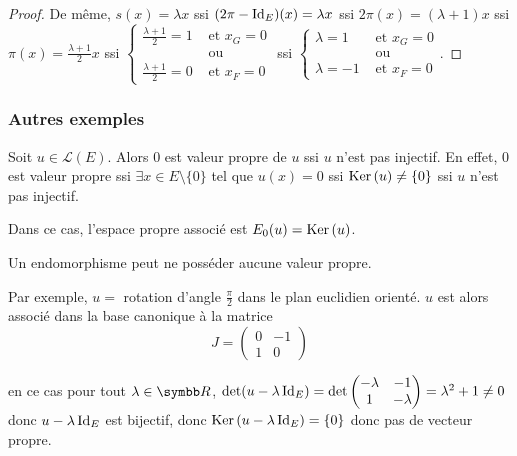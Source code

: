 \begin{exemple}
\begin{proof}
        \avspace De même, $s(x) = \lambda x$ ssi $(2 \pi - \operatorname{Id}_E)(x) = \lambda x$ ssi
        $2 \pi(x) = (\lambda + 1) x$ ssi $\pi(x) = \frac{\lambda + 1}{2} x$ 
        ssi $\begin{cases}
            \frac{\lambda + 1}{2} = 1 &\text{ et } x_G = 0 \\
            & \text{ ou } \\
            \frac{\lambda + 1}{2} = 0 &\text{ et } x_F = 0
        \end{cases}$ ssi $\begin{cases}
            \lambda = 1 &\text{ et } x_G = 0 \\
            & \text{ ou } \\
            \lambda = -1 &\text{ et } x_F = 0
        \end{cases}$.
    \end{proof}
\end{exemple}

\subsubsection{Autres exemples }


\avspace

\begin{exemple}
    Soit $u \in \mathscr L(E)$. Alors $0$ est valeur propre de $u$ ssi $u$ n'est pas injectif.
    En effet, $0$ est valeur propre ssi $\exists x \in E \setminus \{0\}$ tel que $u(x) = 0$ 
    ssi $\operatorname{Ker} \,(u) \neq \{0\}$ ssi $u$ n'est pas injectif.

    Dans ce cas, l'espace propre associé est $E_0(u) = \operatorname{Ker} \,(u)$.
\end{exemple}

Un endomorphisme peut ne posséder aucune valeur propre.

\begin{exemple}
    Par exemple, $u = $ rotation d'angle $\frac \pi 2$ dans le plan euclidien orienté. 
    $u$ est alors associé dans la base canonique à la matrice
    \[
        J = \begin{pmatrix}
            0 & -1 \\
            1 & 0
        \end{pmatrix}
    \]

    en ce cas pour tout $\lambda \in \R$, $\det(u - \lambda \operatorname{Id}_E) = \det \begin{pmatrix}
        -\lambda & -1 \\
        1 & -\lambda
    \end{pmatrix} = \lambda^2 + 1 \neq 0$ donc $u - \lambda \operatorname{Id}_E$ est bijectif, donc 
    $\operatorname{Ker} \,(u - \lambda \operatorname{Id}_E) = \{0\}$ donc pas de vecteur propre. 
\end{exemple}


